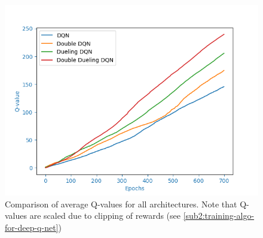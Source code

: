 \begin{figure}[h]
    \centering
    \includegraphics[width=11.5cm]{img/cumulated_qval.png}
    \caption{Comparison of average Q-values for all architectures. Note that Q-values are scaled due to clipping of rewards (see \ref{sub2:training-algo-for-deep-q-net})}
    \label{fig:results-qval-comparison}
\end{figure}